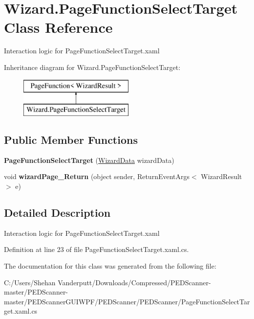\hypertarget{class_wizard_1_1_page_function_select_target}{}\section{Wizard.\+Page\+Function\+Select\+Target Class Reference}
\label{class_wizard_1_1_page_function_select_target}


Interaction logic for Page\+Function\+Select\+Target.\+xaml  


Inheritance diagram for Wizard.\+Page\+Function\+Select\+Target\+:\begin{figure}[H]
\begin{center}
\leavevmode
\includegraphics[height=2.000000cm]{class_wizard_1_1_page_function_select_target}
\end{center}
\end{figure}
\subsection*{Public Member Functions}
\begin{DoxyCompactItemize}
\item 
\mbox{\label{class_wizard_1_1_page_function_select_target_a6cb77d1c6098d224a0b75f96ffdbc090}} 
{\bfseries Page\+Function\+Select\+Target} (\mbox{\hyperlink{class_wizard_1_1_wizard_data}{Wizard\+Data}} wizard\+Data)
\item 
\mbox{\label{class_wizard_1_1_page_function_select_target_a7e764a36bfcebc2cf2eeafc8ee906c10}} 
void {\bfseries wizard\+Page\+\_\+\+Return} (object sender, Return\+Event\+Args$<$ Wizard\+Result $>$ e)
\end{DoxyCompactItemize}


\subsection{Detailed Description}
Interaction logic for Page\+Function\+Select\+Target.\+xaml 



Definition at line 23 of file Page\+Function\+Select\+Target.\+xaml.\+cs.



The documentation for this class was generated from the following file\+:\begin{DoxyCompactItemize}
\item 
C\+:/\+Users/\+Shehan Vanderputt/\+Downloads/\+Compressed/\+P\+E\+D\+Scanner-\/master/\+P\+E\+D\+Scanner-\/master/\+P\+E\+D\+Scanner\+G\+U\+I\+W\+P\+F/\+P\+E\+D\+Scanner/\+P\+E\+D\+Scanner/Page\+Function\+Select\+Target.\+xaml.\+cs\end{DoxyCompactItemize}
